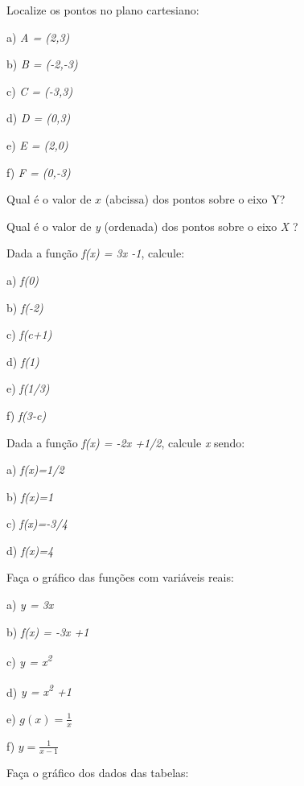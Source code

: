 \begin{exercicios}
\exitem{} Localize os pontos no plano cartesiano:

\begin{multicols}{3}
a) \textit{A = (2,3)}

b) \textit{B = (-2,-3)}

c) \textit{C = (-3,3)}

d) \textit{D = (0,3)}

e)\textit{ E = (2,0)}

f) \textit{F = (0,-3)}
\end{multicols}

\exitem{} Qual é o valor de $x$ (abcissa) dos pontos sobre o eixo Y?

\exitem{} Qual é o valor de \textit{y} (ordenada) dos pontos sobre o eixo \textit{X} ?

\exitem{} Dada a função \textit{f(x) = 3x -1}, calcule:

\begin{multicols}{3}
a) \textit{f(0)}

b) \textit{f(-2)}

c) \textit{f(c+1)}

d) \textit{f(1)}

e) \textit{f(1/3)}

f) \textit{f(3-c)}
\end{multicols}

\exitem{} Dada a função \textit{f(x) = -2x +1/2}, calcule \textit{x} sendo:

\begin{multicols}{2}
a) \textit{f(x)=1/2} 

b) \textit{f(x)=1} 

c) \textit{f(x)=-3/4}

d) \textit{f(x)=4}
\end{multicols}

\exitem{} Faça o gráfico das funções com variáveis reais:

\begin{multicols}{3}
a) \textit{y = 3x}

b) \textit{f(x) = -3x +1 } 

c)  \textit{y = x\textsuperscript{2}}

d) \textit{y = x\textsuperscript{2} +1}

e)  \( g \left( x \right) =\frac{1}{x} \) 

f)  \( y=\frac{1}{x-1} \) 
\end{multicols}

\exitem{} Faça o gráfico dos dados das tabelas: 


\end{exercicios}
